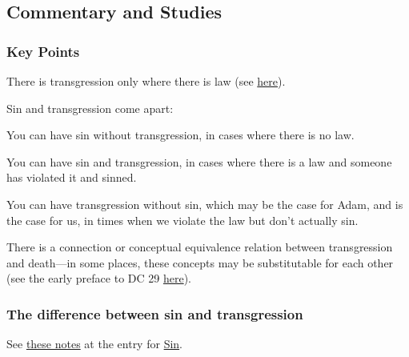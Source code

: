 
	
	
	
	
\subsection{Commentary and Studies} %
	\label{TRANSGRESSION-COMMENTARY}

	\subsubsection{Key Points}
		\label{TRANSGRESSION-KEYS}
	
		\begin{compactitem}
			\item There is transgression only where there is law (see \hyperref[TRANSGRESSION-BD-TDNTA]{here}).
			\item Sin and transgression come apart:
				\begin{compactitem}
					\item You can have sin without transgression, in cases where there is no law.
					\item You can have sin and transgression, in cases where there is a law and someone has violated it and sinned.
					\item You can have transgression without sin, which may be the case for Adam, and is the case for us, in times when we violate the law but don't actually sin.
				\end{compactitem}
			\item There is a connection or conceptual equivalence relation between transgression and death---in some places, these concepts may be substitutable for each other (see the early preface to DC 29 \hyperref[EMS-1830-JS-SEP-1830-A]{here}).
		\end{compactitem}
		
	\subsubsection{The difference between sin and transgression}
		
		See \hyperref[SIN-sin-transgression]{these notes} at the entry for \hyperref[SIN]{Sin}.